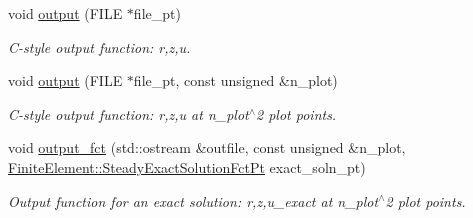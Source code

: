 \begin{DoxyCompactItemize}
void \hyperlink{classoomph_1_1QSteadyAxisymAdvectionDiffusionElement_a9af8f58f84ee30a6fdb2357afd8df51c}{output} (F\+I\+LE $\ast$file\+\_\+pt)
\begin{DoxyCompactList}\small\item\em C-\/style output function\+: r,z,u. \end{DoxyCompactList}\item 
void \hyperlink{classoomph_1_1QSteadyAxisymAdvectionDiffusionElement_ad4d1e0792228024edcb5e8d188fbe326}{output} (F\+I\+LE $\ast$file\+\_\+pt, const unsigned \&n\+\_\+plot)
\begin{DoxyCompactList}\small\item\em C-\/style output function\+: r,z,u at n\+\_\+plot$^\wedge$2 plot points. \end{DoxyCompactList}\item 
void \hyperlink{classoomph_1_1QSteadyAxisymAdvectionDiffusionElement_a6f21bbd8825931be66be210cea87000d}{output\+\_\+fct} (std\+::ostream \&outfile, const unsigned \&n\+\_\+plot, \hyperlink{classoomph_1_1FiniteElement_a690fd33af26cc3e84f39bba6d5a85202}{Finite\+Element\+::\+Steady\+Exact\+Solution\+Fct\+Pt} exact\+\_\+soln\+\_\+pt)
\begin{DoxyCompactList}\small\item\em Output function for an exact solution\+: r,z,u\+\_\+exact at n\+\_\+plot$^\wedge$2 plot points. \end{DoxyCompactList}\end{DoxyCompactItemize}
